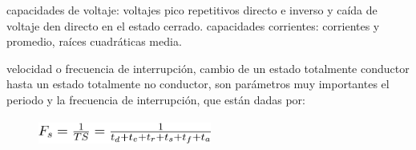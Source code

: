 \documentclass[12pt]{article}
\begin{document}
\setlength{\parskip}{4.2pt}
\begin{adjustwidth}{0.39in}{-0.01in}
 capacidades de voltaje: voltajes pico repetitivos directo e inverso y caída de voltaje den directo en el estado cerrado. capacidades corrientes: corrientes y promedio, raíces cuadráticas media.\par

\end{adjustwidth}

\setlength{\parskip}{4.08pt}
\begin{adjustwidth}{0.25in}{0.0in}
velocidad o frecuencia de interrupción, cambio de un estado totalmente conductor hasta un estado totalmente no conductor, son parámetros muy importantes el periodo y la frecuencia de interrupción, que están dadas por:\par

\end{adjustwidth}


\vspace{\baselineskip}
\setlength{\parskip}{17.28pt}



\begin{figure}[H]
	\begin{Center}
		\includegraphics[width=2.24in,height=0.36in]{./media/image7.png}
	\end{Center}
\end{figure}



\par


\vspace{\baselineskip}
\setlength{\parskip}{8.04pt}

\printbibliography
\end{document}
